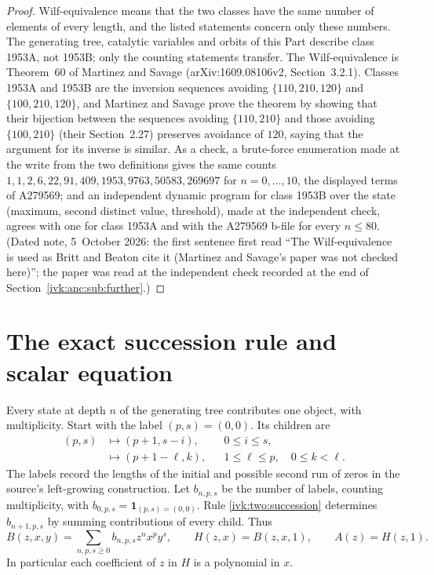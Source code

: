 \documentclass[11pt,letterpaper]{article}
\theoremstyle{remark}\newtheorem{remark}[theorem]{Remark}
\begin{document}
\begin{proof}
Wilf-equivalence means that the two classes have the same number of elements of every length, and the listed statements concern only these numbers. The generating tree, catalytic variables and orbits of this Part describe class 1953A, not 1953B; only the counting statements transfer. The Wilf-equivalence is Theorem~60 of Martinez and Savage \cite{ms} (arXiv:1609.08106v2, Section~3.2.1). Classes 1953A and 1953B are the inversion sequences avoiding $\{110,210,120\}$ and $\{100,210,120\}$, and Martinez and Savage prove the theorem by showing that their bijection between the sequences avoiding $\{110,210\}$ and those avoiding $\{100,210\}$ (their Section~2.27) preserves avoidance of $120$, saying that the argument for its inverse is similar. As a check, a brute-force enumeration made at the write from the two definitions gives the same counts $1,1,2,6,22,91,409,1953,9763,50583,269697$ for $n=0,\ldots,10$, the displayed terms of A279569; and an independent dynamic program for class 1953B over the state (maximum, second distinct value, threshold), made at the independent check, agrees with one for class 1953A and with the A279569 b-file for every $n\le80$. (Dated note, 5~October 2026: the first sentence first read ``The Wilf-equivalence is used as Britt and Beaton cite it (Martinez and Savage's paper was not checked here)''; the paper was read at the independent check recorded at the end of Section~\ref{ivk:anc:sub:further}.)
\end{proof}


\section{The exact succession rule and scalar equation}
Every state at depth $n$ of the generating tree contributes one object,
with multiplicity. Start with the label $(p,s)=(0,0)$. Its children are
\begin{equation}\label{ivk:two:succession}
\begin{aligned}
 (p,s)&\longmapsto(p+1,s-i),&&0\le i\le s,\\
      &\longmapsto(p+1-\ell,k),&&1\le\ell\le p,\quad0\le k<\ell.
\end{aligned}
\end{equation}
The labels record the lengths of the initial and possible second run
of zeros in the source's left-growing construction. Let $b_{n,p,s}$ be
the number of labels, counting multiplicity, with
$b_{0,p,s}=\mathbf1_{(p,s)=(0,0)}$. Rule \eqref{ivk:two:succession} determines
$b_{n+1,p,s}$ by summing contributions of every child. Thus
\[
 B(z,x,y)=\sum_{n,p,s\ge0}b_{n,p,s}z^nx^py^s,\qquad
 H(z,x)=B(z,x,1),\qquad A(z)=H(z,1).
\]
In particular each coefficient of $z$ in $H$ is a polynomial in $x$.
\end{document}
